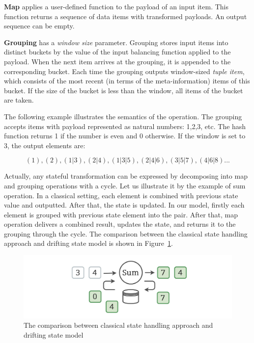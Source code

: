 {\bf Map} applies a user-defined function to the payload of an input item. This function returns a sequence of data items with transformed payloads. An output sequence can be empty.

{\bf Grouping} has a {\it window size} parameter. Grouping stores input items into distinct buckets by the value of the input balancing function applied to the payload. When the next item arrives at the grouping, it is appended to the corresponding bucket. Each time the grouping outputs window-sized {\it tuple item}, which consists of the most recent (in terms of the meta-information) items of this bucket. If the size of the bucket is less than the window, all items of the bucket are taken.

The following example illustrates the semantics of the operation. The grouping accepts items with payload represented as natural numbers: 1,2,3, etc. The hash function returns 1 if the number is even and 0 otherwise. If the window is set to 3, the output elements are:

\[(1), (2), (1|3), (2|4), (1|3|5), (2|4|6), (3|5|7), (4|6|8)...\]

Actually, any stateful transformation can be expressed by decomposing into map and grouping operations with a cycle. Let us illustrate it by the example of sum operation. In a classical setting, each element is combined with previous state value and outputted. After that, the state is updated. In our model, firstly each element is grouped with previous state element into the pair. After that, map operation delivers a combined result, updates the state, and returns it to the grouping through the cycle. The comparison between the classical state handling approach and drifting state model is shown in Figure~\ref{classical-drifting}.

\begin{figure}[htbp]
  \centering
  \includegraphics[width=.49\textwidth]{pics/classical-drifting}
  \caption{The comparison between classical state handling approach and drifting state model}
  \label {classical-drifting}
\end{figure}

